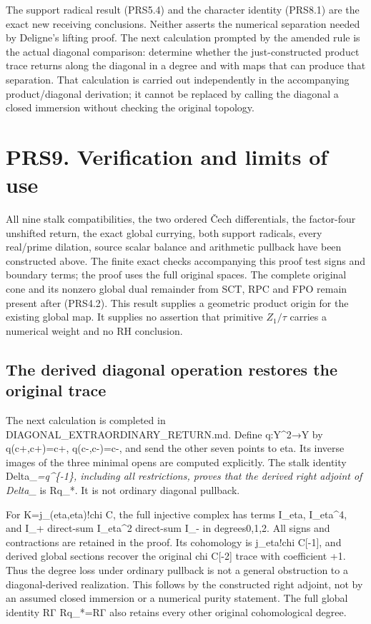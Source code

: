 The support radical result (PRS5.4) and the character identity (PRS8.1)
are the exact new receiving conclusions. Neither asserts the numerical
separation needed by Deligne's lifting proof. The next calculation
prompted by the amended rule is the actual diagonal comparison:
determine whether the just-constructed product trace returns along the
diagonal in a degree and with maps that can produce that separation.
That calculation is carried out independently in the accompanying
product/diagonal derivation; it cannot be replaced by calling the
diagonal a closed immersion without checking the original topology.

\section{PRS9. Verification and limits of
use}\label{prs9.-verification-and-limits-of-use}

All nine stalk compatibilities, the two ordered Čech differentials, the
factor-four unshifted return, the exact global currying, both support
radicals, every real/prime dilation, source scalar balance and
arithmetic pullback have been constructed above. The finite exact checks
accompanying this proof test signs and boundary terms; the proof uses
the full original spaces. The complete original cone and its nonzero
global dual remainder from SCT, RPC and FPO remain present after
(PRS4.2). This result supplies a geometric product origin for the
existing global map. It supplies no assertion that primitive
\(Z_1/\tau\) carries a numerical weight and no RH conclusion.

\subsection{The derived diagonal operation restores the original
trace}\label{the-derived-diagonal-operation-restores-the-original-trace}

The next calculation is completed in DIAGONAL\_EXTRAORDINARY\_RETURN.md.
Define q:Y\^{}2→Y by q(c+,c+)=c+, q(c-,c-)=c-, and send the other seven
points to eta. Its inverse images of the three minimal opens are
computed explicitly. The stalk identity Delta\_\emph{=q\^{}\{-1\},
including all restrictions, proves that the derived right adjoint of
Delta\_} is Rq\_*. It is not ordinary diagonal pullback.

For K=j\_(eta,eta)!chi C, the full injective complex has terms I\_eta,
I\_eta\^{}4, and I\_+ direct-sum I\_eta\^{}2 direct-sum I\_- in
degrees0,1,2. All signs and contractions are retained in the proof. Its
cohomology is j\_eta!chi C{[}-1{]}, and derived global sections recover
the original chi C{[}-2{]} trace with coefficient +1. Thus the degree
loss under ordinary pullback is not a general obstruction to a
diagonal-derived realization. This follows by the constructed right
adjoint, not by an assumed closed immersion or a numerical purity
statement. The full global identity RΓ Rq\_*=RΓ also retains every other
original cohomological degree.

